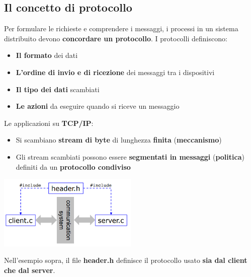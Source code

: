 \documentclass[12pt]{article}
\begin{document}
\subsection{Il concetto di protocollo}
Per formulare le richieste e comprendere i messaggi, i processi in un sistema distribuito devono \textbf{concordare un protocollo}. I protocolli definiscono:
\begin{itemize}
    \item \textbf{Il formato} dei dati
    \item \textbf{L'ordine di invio e di ricezione} dei messaggi tra i dispositivi
    \item \textbf{Il tipo dei dati} scambiati
    \item \textbf{Le azioni} da eseguire quando si riceve un messaggio
\end{itemize}
Le applicazioni su \textbf{TCP/IP}:
\begin{itemize}
    \item Si scambiano \textbf{stream di byte} di lunghezza \textbf{finita} (\textbf{meccanismo})
    \item Gli stream scambiati possono essere \textbf{segmentati in messaggi} (\textbf{politica}) definiti da un \textbf{protocollo condiviso}
\end{itemize}
\begin{center}
    \includegraphics[width = 0.50\textwidth]{Images/20.png}
\end{center}
Nell'esempio sopra, il file \textbf{header.h} definisce il protocollo usato \textbf{sia dal client che dal server}.
\end{document}
